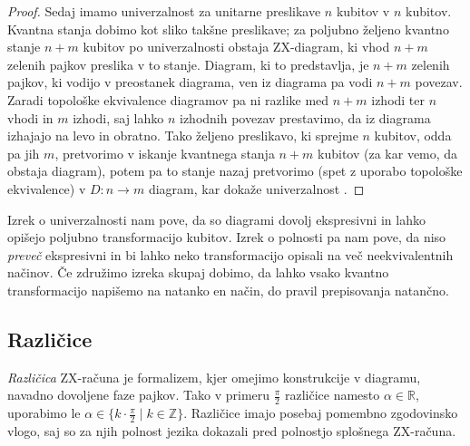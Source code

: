 \documentclass[mat1]{fmfdelo}
\newcommand{\R}{\mathbb R}
\newcommand{\Z}{\mathbb Z}
\begin{document}
\begin{proof}
Sedaj imamo univerzalnost za unitarne preslikave \(n\) kubitov v \(n\) kubitov. Kvantna stanja dobimo kot sliko takšne preslikave; za poljubno željeno kvantno stanje \(n+m\) kubitov po univerzalnosti obstaja ZX-diagram, ki vhod \(n+m\) zelenih pajkov preslika v to stanje. Diagram, ki to predstavlja, je \(n+m\) zelenih pajkov, ki vodijo v preostanek diagrama, ven iz diagrama pa vodi \(n+m\) povezav. Zaradi topološke ekvivalence diagramov pa ni razlike med \(n+m\) izhodi ter \(n\) vhodi in \(m\) izhodi, saj lahko \(n\) izhodnih povezav prestavimo, da iz diagrama izhajajo na levo in obratno. Tako željeno preslikavo, ki sprejme \(n\) kubitov, odda pa jih \(m\), pretvorimo v iskanje kvantnega stanja \(n+m\) kubitov (za kar vemo, da obstaja diagram), potem pa to stanje nazaj pretvorimo (spet z uporabo topološke ekvivalence) v \(D:n\to m\) diagram, kar dokaže univerzalnost \cite[Izrek 2.18]{Coecke_2011}. \end{proof}

Izrek o univerzalnosti nam pove, da so diagrami dovolj ekspresivni in lahko opišejo poljubno transformacijo kubitov. Izrek o polnosti pa nam pove, da niso \emph{preveč} ekspresivni in bi lahko neko transformacijo opisali na več neekvivalentnih načinov. Če združimo izreka skupaj dobimo, da lahko vsako kvantno transformacijo napišemo na natanko en način, do pravil prepisovanja natančno.

\subsection{Različice}
\emph{Različica} ZX-računa je formalizem, kjer omejimo konstrukcije v diagramu, navadno dovoljene faze pajkov. Tako v primeru \(\frac\pi2\) različice namesto \(\alpha\in \R\), uporabimo le \(\alpha\in\{k\cdot \frac\pi2\mid k\in\Z\}\). Različice imajo posebaj pomembno zgodovinsko vlogo, saj so za njih polnost jezika dokazali pred polnostjo splošnega ZX-računa.
\end{document}
